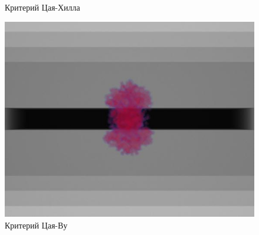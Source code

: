 \documentclass[xcolor={usenames,dvipsnames,svgnames,table}]{beamer}
\begin{document}
\begin{frame}
\begin{center}
\begin{minipage}[h]{0.30\textwidth}
\begin{figure}[h]
                \tiny
                \caption{Критерий Цая-Хилла}
            \end{figure}
        \end{minipage}
        \begin{minipage}[h]{0.30\textwidth}
            \begin{figure}[h]
                \includegraphics[width=\textwidth]{png/3-stringer-panel/stringer-tsai-wu.png}
                \tiny
                \caption{Критерий Цая-Ву}
            \end{figure}
        \end{minipage}
    \end{center}
\end{frame}
\end{document}
